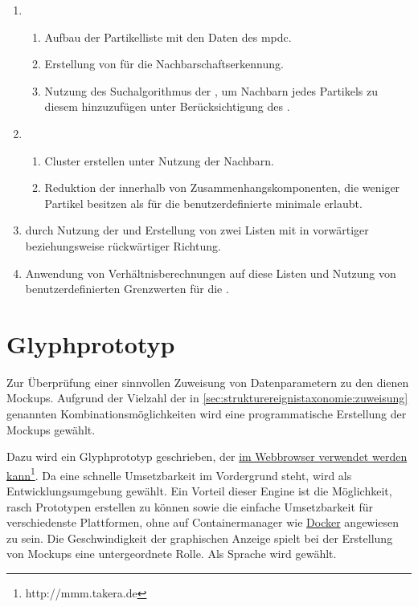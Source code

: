 \begin{enumerate}
	\item
	\begin{enumerate}
		\item Aufbau der Partikelliste mit den Daten des \gls{mpdc}.
		\item Erstellung von  für die Nachbarschaftserkennung.
		\item Nutzung des  Suchalgorithmus der \ANN, um Nachbarn jedes Partikels zu diesem hinzuzufügen unter Berücksichtigung des .
	\end{enumerate}
	\item
	\begin{enumerate}
		\item Cluster erstellen unter Nutzung der Nachbarn.
		\item Reduktion der  innerhalb von Zusammenhangskomponenten, die weniger Partikel besitzen als für die benutzerdefinierte minimale  erlaubt.
	\end{enumerate}
	\item \SECC durch Nutzung der  und Erstellung von zwei Listen mit  in vorwärtiger beziehungsweise rückwärtiger Richtung.
	\item Anwendung von Verhältnisberechnungen auf diese Listen und Nutzung von benutzerdefinierten Grenzwerten für die .
\end{enumerate}

\section{Glyphprototyp}\label{sec:glyphprototyp}
Zur Überprüfung einer sinnvollen Zuweisung von Datenparametern zu den  dienen Mockups. Aufgrund der Vielzahl der in \autoref{sec:strukturereignistaxonomie:zuweisung} genannten Kombinationsmöglichkeiten wird eine programmatische Erstellung der Mockups gewählt.

Dazu wird ein Glyphprototyp geschrieben, der \href{http://mmm.takera.de}{im Webbrowser verwendet werden kann}\footnote{http://mmm.takera.de}. Da eine schnelle Umsetzbarkeit im Vordergrund steht, wird  als Entwicklungsumgebung gewählt. Ein Vorteil dieser Engine ist die Möglichkeit, rasch Prototypen erstellen zu können sowie die einfache Umsetzbarkeit für verschiedenste Plattformen, ohne auf Containermanager wie \href{https://www.docker.com/}{Docker} angewiesen zu sein.
Die Geschwindigkeit der graphischen Anzeige spielt bei der Erstellung von Mockups eine untergeordnete Rolle. Als Sprache wird  gewählt.

